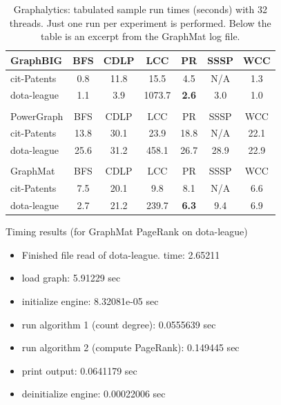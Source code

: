 \documentclass[conference]{IEEEtran}
\begin{document}
\begin{table}
	\caption{Graphalytics: tabulated sample run times (seconds) with 32 threads. Just one run per experiment is performed. Below the table is an excerpt from the GraphMat log file.}
	\label{tab:graphalytics-realworld}
	\vspace{-10pt}
	\begin{center}
		\begin{tabular}{l|c|c|c|c|c|c}
			GraphBIG & BFS  & CDLP  &   LCC   &  PR &  SSSP & WCC \\ \hline
			cit-Patents & 0.8 & 11.8 & 15.5  &  4.5 & N/A  & 1.3 \\
			dota-league & 1.1 & 3.9 & 1073.7 &  {\bf 2.6} & 3.0 & 1.0 \\
			\multicolumn{7}{l}{} \\
			PowerGraph & BFS  & CDLP  &   LCC   &  PR &  SSSP & WCC \\ \hline
			cit-Patents & 13.8 & 30.1 & 23.9 & 18.8 & N/A & 22.1 \\
			dota-league & 25.6 & 31.2 & 458.1 & 26.7 & 28.9 & 22.9 \\
			\multicolumn{7}{l}{} \\
			GraphMat & BFS  & CDLP  &   LCC   &  PR &  SSSP & WCC \\ \hline
			cit-Patents &  7.5 &  20.1 & 9.8 &  8.1 & N/A  & 6.6 \\
			dota-league &  2.7 &  21.2 & 239.7 & {\bf 6.3} & 9.4 & 6.9 \\
		\end{tabular}
	\end{center}

	\noindent Timing results (for GraphMat PageRank on dota-league)
	\begin{itemize}
		\item Finished file read of dota-league. time: 2.65211
		\item load graph: 5.91229 sec
		\item initialize engine: 8.32081e-05 sec
		\item run algorithm 1 (count degree): 0.0555639 sec
		\item run algorithm 2 (compute PageRank): 0.149445 sec
		\item print output: 0.0641179 sec
		\item deinitialize engine: 0.00022006 sec
	\end{itemize}
\end{table}
\end{document}
